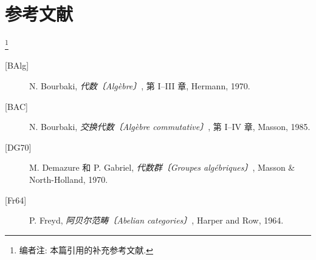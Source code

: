 \section*{参考文献}
\footnote{编者注: 本篇引用的补充参考文献.}

\begin{description}
\item[{[BAlg]}] N. Bourbaki, \emph{代数〔Alg\`ebre〕}, 第 I--III 章,
  Hermann, 1970.
\item[{[BAC]}] N. Bourbaki, \emph{交换代数〔Alg\`ebre commutative〕}, 第 I--IV 章,
  Masson, 1985.
\item[{[DG70]}] M. Demazure 和 P. Gabriel,
  \emph{代数群〔Groupes alg\'ebriques〕}, Masson \& North-Holland, 1970.
\item[{[Fr64]}] P. Freyd, \emph{阿贝尔范畴〔Abelian categories〕}, Harper and Row,
  1964.
\end{description}


